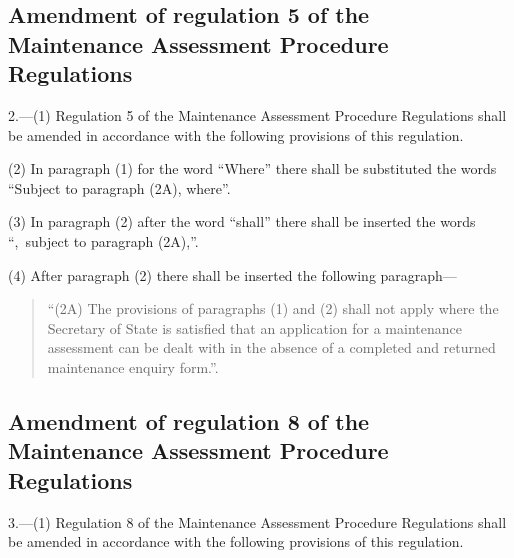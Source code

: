 \documentclass[a4paper]{article}
\begin{document}
\subsection[2. Amendment of regulation 5 of the Maintenance Assessment Procedure Regulations]{Amendment of regulation 5 of the Maintenance Assessment Procedure Regulations}

2.—(1) Regulation 5 of the Maintenance Assessment Procedure Regulations shall be amended in accordance with the following provisions of this regulation.

(2) In paragraph (1) for the word “Where” there shall be substituted the words “Subject to paragraph (2A), where”.

(3) In paragraph (2) after the word “shall” there shall be inserted the words “,~subject to paragraph (2A),”.

(4) After paragraph (2) there shall be inserted the following paragraph---
\begin{quotation}
“(2A) The provisions of paragraphs (1) and (2) shall not apply where the Secretary of State is satisfied that an application for a maintenance assessment can be dealt with in the absence of a completed and returned maintenance enquiry form.”.
\end{quotation}

\subsection[3. Amendment of regulation 8 of the Maintenance Assessment Procedure Regulations]{Amendment of regulation 8 of the Maintenance Assessment Procedure Regulations}

3.—(1) Regulation 8 of the Maintenance Assessment Procedure Regulations shall be amended in accordance with the following provisions of this regulation.
\end{document}
